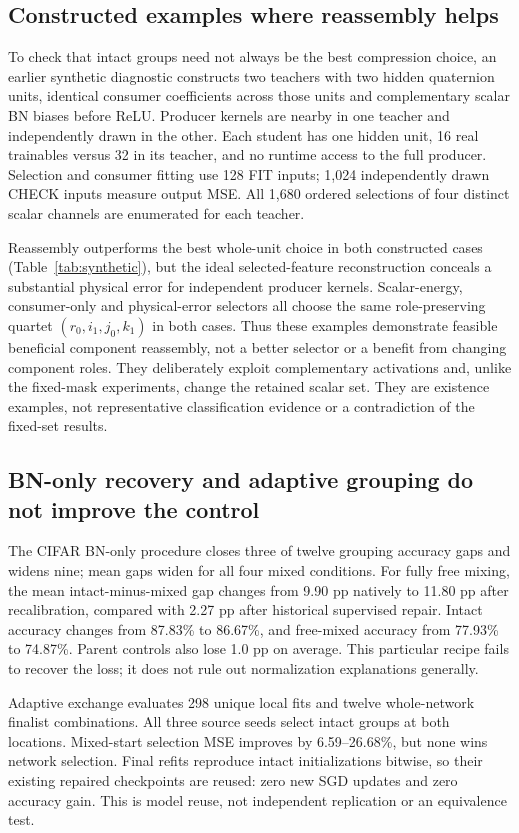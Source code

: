 \documentclass[conference,letterpaper,10pt]{IEEEtran}
\begin{document}
\subsection{Constructed examples where reassembly helps}
To check that intact groups need not always be the best compression choice, an earlier synthetic diagnostic constructs two teachers with two hidden quaternion units, identical consumer coefficients across those units and complementary scalar BN biases before ReLU. Producer kernels are nearby in one teacher and independently drawn in the other. Each student has one hidden unit, 16 real trainables versus 32 in its teacher, and no runtime access to the full producer. Selection and consumer fitting use 128 FIT inputs; 1,024 independently drawn CHECK inputs measure output MSE. All 1,680 ordered selections of four distinct scalar channels are enumerated for each teacher.


Reassembly outperforms the best whole-unit choice in both constructed cases (Table~\ref{tab:synthetic}), but the ideal selected-feature reconstruction conceals a substantial physical error for independent producer kernels. Scalar-energy, consumer-only and physical-error selectors all choose the same role-preserving quartet $(r_0,i_1,j_0,k_1)$ in both cases. Thus these examples demonstrate feasible beneficial component reassembly, not a better selector or a benefit from changing component roles. They deliberately exploit complementary activations and, unlike the fixed-mask experiments, change the retained scalar set. They are existence examples, not representative classification evidence or a contradiction of the fixed-set results.

\subsection{BN-only recovery and adaptive grouping do not improve the control}
The CIFAR BN-only procedure closes three of twelve grouping accuracy gaps and widens nine; mean gaps widen for all four mixed conditions. For fully free mixing, the mean intact-minus-mixed gap changes from 9.90 pp natively to 11.80 pp after recalibration, compared with 2.27 pp after historical supervised repair. Intact accuracy changes from 87.83\% to 86.67\%, and free-mixed accuracy from 77.93\% to 74.87\%. Parent controls also lose 1.0 pp on average. This particular recipe fails to recover the loss; it does not rule out normalization explanations generally.

Adaptive exchange evaluates 298 unique local fits and twelve whole-network finalist combinations. All three source seeds select intact groups at both locations. Mixed-start selection MSE improves by 6.59--26.68\%, but none wins network selection. Final refits reproduce intact initializations bitwise, so their existing repaired checkpoints are reused: zero new SGD updates and zero accuracy gain. This is model reuse, not independent replication or an equivalence test.
\end{document}
